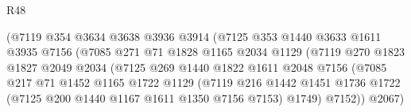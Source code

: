 \begin{lexlean}{R48}
\begin{coremodule}
                                      (@7119
                                        @354
                                        @3634
                                        @3638
                                        @3936
                                        @3914
                                        (@7125
                                          @353
                                          @1440
                                          @3633
                                          @1611
                                          @3935
                                          @7156
                                          (@7085
                                            @271
                                            @71
                                            @1828
                                            @1165
                                            @2034
                                            @1129
                                            (@7119
                                              @270
                                              @1823
                                              @1827
                                              @2049
                                              @2034
                                              (@7125
                                                @269
                                                @1440
                                                @1822
                                                @1611
                                                @2048
                                                @7156
                                                (@7085
                                                  @217
                                                  @71
                                                  @1452
                                                  @1165
                                                  @1722
                                                  @1129
                                                  (@7119
                                                    @216
                                                    @1442
                                                    @1451
                                                    @1736
                                                    @1722
                                                    (@7125 @200 @1440 @1167 @1611 @1350 @7156 @7153)
                                                    @1749)
                                                  @7152))
                                              @2067)

\end{coremodule}
\end{lexlean}
